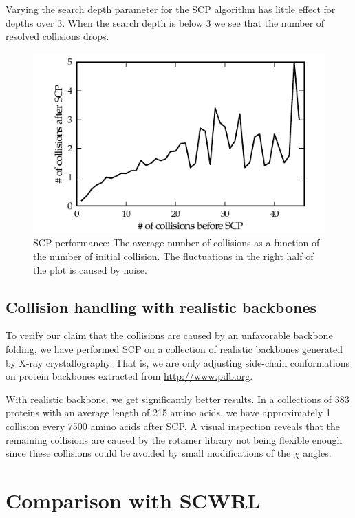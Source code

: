 Varying the search depth parameter for the SCP algorithm has little effect for depths over 3.
When the search depth is below 3 we see that the number of resolved collisions drops.

\label{sec:evaluation_handling_side-chains}
\begin{figure}
	\centering
	\hspace*{-3.5mm}\includegraphics[width=1.1\columnwidth]{figures/plot_scp}
	\caption{SCP performance: The average number of collisions as a function of the number of initial collision. The fluctuations in the right half of the plot is caused by noise.}
	\label{fig:plot_scp}
\end{figure}

\subsection{Collision handling with realistic backbones}
To verify our claim that the collisions are caused by an unfavorable backbone folding, we have performed SCP on a collection of realistic backbones generated by X-ray crystallography.
That is, we are only adjusting side-chain conformations on protein backbones extracted from \url{http://www.pdb.org}. 

With realistic backbone, we get significantly better results.
In a collections of 383 proteins with an average length of 215 amino acids, we have approximately 1 collision every 7500 amino acids after SCP.
A visual inspection reveals that the remaining collisions are caused by the rotamer library not being flexible enough since these collisions could be avoided by small modifications of the $\chi$ angles.


\section{Comparison with SCWRL}

